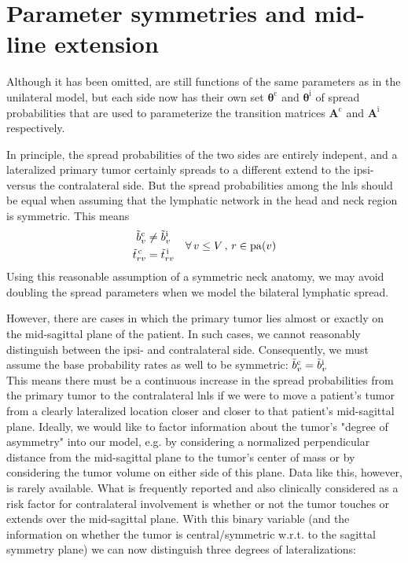 \documentclass[\relativeRoot/main.tex]{subfiles}
\begin{document}
\section{Parameter symmetries and mid-line extension}
\label{sec:bilateral:parameter_symmetries}

Although it has been omitted,  are still functions of the same parameters as in the unilateral model, but each side now has their own set $\boldsymbol{\theta}^\text{c}$ and $\boldsymbol{\theta}^\text{i}$ of spread probabilities that are used to parameterize the transition matrices $\mathbf{A}^\text{c}$ and $\mathbf{A}^\text{i}$ respectively.

In principle, the spread probabilities of the two sides are entirely indepent, and a lateralized primary tumor certainly spreads to a different extend to the ipsi- versus the contralateral side. But the spread probabilities among the \glspl{lnl} should be equal when assuming that the lymphatic network in the head and neck region is symmetric. This means
%
\begin{equation}
    \begin{aligned}
        \Tilde{b}^\text{c}_v &\neq \Tilde{b}^\text{i}_v \\
        \Tilde{t}^\text{\,c}_{rv} &= \Tilde{t}^\text{\,i}_{rv}
    \end{aligned}
    \quad \forall \, v \leq V \, , \, r \in \operatorname{pa}(v)
\end{equation}
%
Using this reasonable assumption of a symmetric neck anatomy, we may avoid doubling the spread parameters when we model the bilateral lymphatic spread.

However, there are cases in which the primary tumor lies almost or exactly on the mid-sagittal plane of the patient. In such cases, we cannot reasonably distinguish between the ipsi- and contralateral side. Consequently, we must assume the base probability rates as well to be symmetric: $\Tilde{b}^\text{c}_v = \Tilde{b}^\text{i}_v$ \\
This means there must be a continuous increase in the spread probabilities from the primary tumor to the contralateral \glspl{lnl} if we were to move a patient's tumor from a clearly lateralized location closer and closer to that patient's mid-sagittal plane. Ideally, we would like to factor information about the tumor's "degree of asymmetry" into our model, e.g. by considering a normalized perpendicular distance from the mid-sagittal plane to the tumor's center of mass or by considering the tumor volume on either side of this plane. Data like this, however, is rarely available. What is frequently reported and also clinically considered as a risk factor for contralateral involvement is whether or not the tumor touches or extends over the mid-sagittal plane. With this binary variable (and the information on whether the tumor is central/symmetric w.r.t. to the sagittal symmetry plane) we can now distinguish three degrees of lateralizations:
\end{document}
